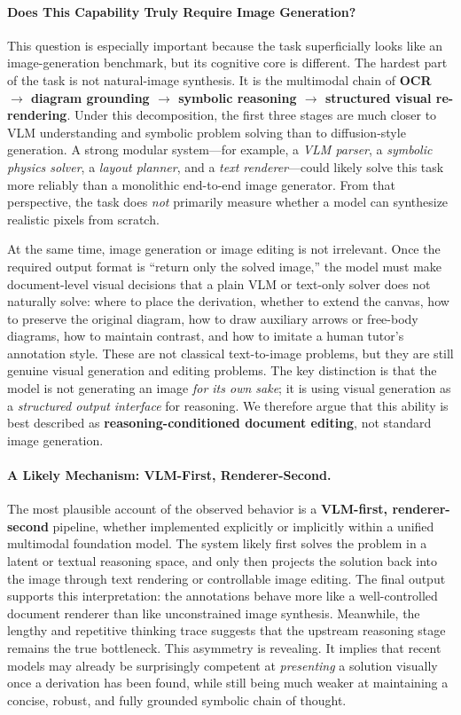\paragraph{Does This Capability Truly Require Image Generation?}
This question is especially important because the task superficially looks like an image-generation benchmark, but its cognitive core is different. The hardest part of the task is not natural-image synthesis. It is the multimodal chain of \textbf{OCR $\rightarrow$ diagram grounding $\rightarrow$ symbolic reasoning $\rightarrow$ structured visual re-rendering}. Under this decomposition, the first three stages are much closer to VLM understanding and symbolic problem solving than to diffusion-style generation. A strong modular system---for example, a \emph{VLM parser}, a \emph{symbolic physics solver}, a \emph{layout planner}, and a \emph{text renderer}---could likely solve this task more reliably than a monolithic end-to-end image generator. From that perspective, the task does \emph{not} primarily measure whether a model can synthesize realistic pixels from scratch.

At the same time, image generation or image editing is not irrelevant. Once the required output format is ``return only the solved image,'' the model must make document-level visual decisions that a plain VLM or text-only solver does not naturally solve: where to place the derivation, whether to extend the canvas, how to preserve the original diagram, how to draw auxiliary arrows or free-body diagrams, how to maintain contrast, and how to imitate a human tutor's annotation style. These are not classical text-to-image problems, but they are still genuine visual generation and editing problems. The key distinction is that the model is not generating an image \emph{for its own sake}; it is using visual generation as a \emph{structured output interface} for reasoning. We therefore argue that this ability is best described as \textbf{reasoning-conditioned document editing}, not standard image generation.

\paragraph{A Likely Mechanism: VLM-First, Renderer-Second.}
The most plausible account of the observed behavior is a \textbf{VLM-first, renderer-second} pipeline, whether implemented explicitly or implicitly within a unified multimodal foundation model. The system likely first solves the problem in a latent or textual reasoning space, and only then projects the solution back into the image through text rendering or controllable image editing. The final output supports this interpretation: the annotations behave more like a well-controlled document renderer than like unconstrained image synthesis. Meanwhile, the lengthy and repetitive thinking trace suggests that the upstream reasoning stage remains the true bottleneck. This asymmetry is revealing. It implies that recent models may already be surprisingly competent at \emph{presenting} a solution visually once a derivation has been found, while still being much weaker at maintaining a concise, robust, and fully grounded symbolic chain of thought.

